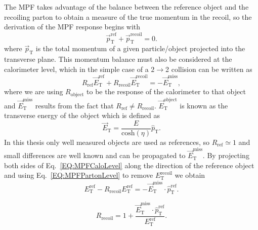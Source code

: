 The MPF takes advantage of the balance between the reference object and the recoiling parton to obtain a measure of the true momentum in the recoil, so the derivation of the MPF response begins with 
\begin{equation}
  \label{EQ:MPFPartonLevel}
  \vec{p}_{\mathrm T}^{\mathrm{ref}}+\vec{p}_{\mathrm T}^{\mathrm{recoil}} = 0.  
\end{equation}
\noindent
where $\vec{p}_{\mathrm T}$ is the total momentum of a given particle/object projected into the transverse plane.   
This momentum balance must also be considered at the calorimeter level, which in the simple case of a $2\rightarrow$2 collision can be written as
\begin{equation}
  \label{EQ:MPFCaloLevel}
  R_{\mathrm{ref}}\vec{E}_{\mathrm T}^{\mathrm{ref}}+R_{\mathrm{recoil}}\vec{E}_{\mathrm T}^{\mathrm{recoil}}=-\vec{E}_{\mathrm T}^{\mathrm{miss}},
\end{equation}
\noindent
where we are using $R_{\mathrm{object}}$ to be the response of the calorimeter to that object and $\vec{E}_{\mathrm T}^{\mathrm{miss}}$ results from the fact that $R_{\mathrm{ref}} \neq R_{\mathrm{recoil}}$.  
$\vec{E}_{\mathrm T}^{\mathrm{object}}$ is known as the transverse energy of the object which is defined as
\begin{equation}
  \vec{E}_{\mathrm T}=\frac{E}{\mathrm{cosh}\left(\eta\right)}\hat{p}_{\mathrm T}.  
\end{equation}
\noindent
In this thesis only well measured objects are used as references, so $R_{\mathrm{ref}}\simeq1$ and small differences are well known and can be propagated to $\vec{E}_{\mathrm T}^{\mathrm{miss}}$.  
By projecting both sides of Eq.~\ref{EQ:MPFCaloLevel} along the direction of the reference object and using Eq.~\ref{EQ:MPFPartonLevel} to remove ${E}_{\mathrm T}^{\mathrm{recoil}}$ we obtain
\begin{equation}
  E_{\mathrm T}^{\mathrm{ref}}-R_{\mathrm{recoil}}E_{\mathrm T}^{\mathrm{ref}}=-\vec{E}_{\mathrm T}^{\mathrm{miss}}\cdot\hat{p}_{\mathrm T}^{\mathrm{ref}}.
\end{equation} 

\begin{equation}
  \label{EQ:MPFSimple}
  R_{\mathrm{recoil}}=1+\frac{\vec{E}_{\mathrm T}^{\mathrm{miss}}\cdot\hat{p}_{\mathrm T}^{\mathrm{ref}}}{E_{\mathrm T}^{\mathrm{ref}}}.
\end{equation}

